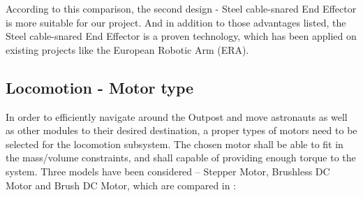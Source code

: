 \documentclass[12pt, letterpaper]{article}
\begin{document}
According to this comparison, the second design - Steel cable-snared End Effector is more suitable for our project. And in addition to those advantages listed, the Steel cable-snared End Effector is a proven technology, which has been applied on existing projects like the European Robotic Arm (ERA).

\subsection{Locomotion - Motor type}
\label{motorto}
In order to efficiently navigate around the Outpost and move astronauts as well as other modules to their desired destination, a proper types of motors need to be selected for the locomotion subsystem. The chosen motor shall be able to fit in the mass/volume constraints, and shall capable of providing enough torque to the system. Three models have been considered – Stepper Motor, Brushless DC Motor and Brush DC Motor, which are compared in :
\end{document}
